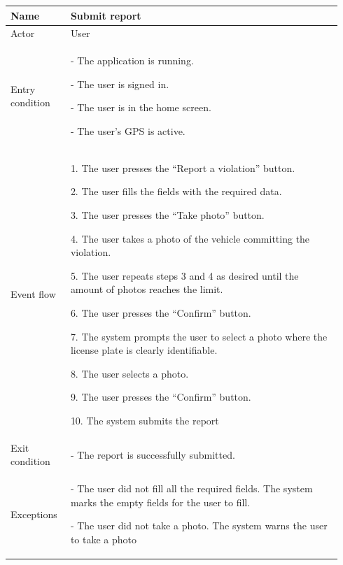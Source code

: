 \begin{table}[H]
\begin{tabular}{|p{0.17\linewidth}|p{0.77\linewidth}|}
\hline
Name            & Submit report
\\ \hline

Actor           & User
\\ \hline

Entry condition &
    - The application is running.

    - The user is signed in.

    - The user is in the home screen.

    - The user’s GPS is active.
\\ \hline
Event flow      & 
    1. The user presses the “Report a violation” button.

    2. The user fills the fields with the required data.

    3. The user presses the “Take photo” button.

    4. The user takes a photo of the vehicle committing the violation.

    5. The user repeats steps 3 and 4 as desired until the amount of photos reaches the limit.

    6. The user presses the “Confirm” button.

    7. The system prompts the user to select a photo where the license plate is clearly identifiable.

    8. The user selects a photo.

    9. The user presses the “Confirm” button.
    
    10. The system submits the report
\\ \hline
Exit condition  & 
    - The report is successfully submitted.
\\ \hline
Exceptions      &
    - The user did not fill all the required fields. The system marks the empty fields for the user to fill.

    - The user did not take a photo. The system warns the user to take a photo
\\ \hline
\end{tabular}
\end{table}

